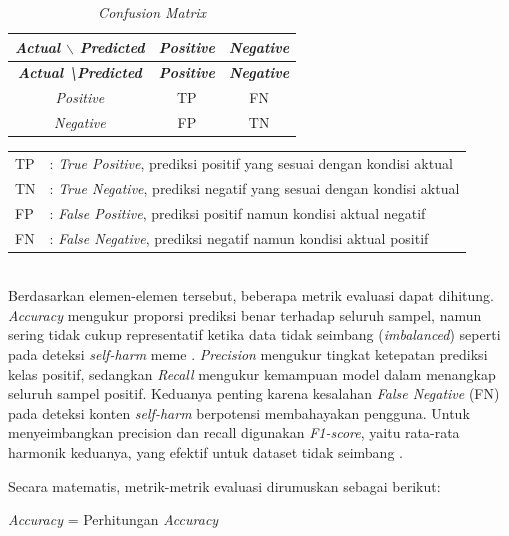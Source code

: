 \begin{longtable}{|c|c|c|}
\caption{\textit{Confusion Matrix}}
\label{table:confmatrix}\\
\hline
\textbf{\textit{Actual $\backslash$ Predicted}} & \textbf{\textit{Positive}} & \textbf{\textit{Negative}} \\
\hline
\endfirsthead

\hline
\textbf{\textit{Actual \textbackslash Predicted}} & \textbf{\textit{Positive}} & \textbf{\textit{Negative}} \\
\hline
\endhead

\textit{Positive} & TP & FN \\
\hline
\textit{Negative} & FP & TN \\
\hline
\end{longtable}

\noindent
{}

\begin{tabular}{l l}
TP & : \textit{True Positive}, prediksi positif yang sesuai dengan kondisi aktual \\ 
TN & : \textit{True Negative}, prediksi negatif yang sesuai dengan kondisi aktual \\ 
FP & : \textit{False Positive}, prediksi positif namun kondisi aktual negatif \\ 
FN & : \textit{False Negative}, prediksi negatif namun kondisi aktual positif \\ 
\end{tabular} \\

Berdasarkan elemen-elemen tersebut, beberapa metrik evaluasi dapat dihitung. 
\textit{Accuracy} mengukur proporsi prediksi benar terhadap seluruh sampel, 
namun sering tidak cukup representatif ketika data tidak seimbang 
(\textit{imbalanced}) seperti pada deteksi \textit{self-harm} meme \cite{sokolova2009systematic}. \textit{Precision} mengukur tingkat ketepatan prediksi kelas positif, sedangkan 
\textit{Recall} mengukur kemampuan model dalam menangkap seluruh sampel positif. 
Keduanya penting karena kesalahan \textit{False Negative} (FN) pada deteksi 
konten \textit{self-harm} berpotensi membahayakan pengguna. 
Untuk menyeimbangkan precision dan recall digunakan \textit{F1-score}, yaitu 
rata-rata harmonik keduanya, yang efektif untuk dataset tidak seimbang 
\cite{powers2020evaluationprecisionrecallfmeasure}.

Secara matematis, metrik-metrik evaluasi dirumuskan sebagai berikut:

\begin{equationcaptioned}[eq:accuracy]{
\textit{Accuracy} = 
}{
Perhitungan \textit{Accuracy}
}
\end{equationcaptioned}

